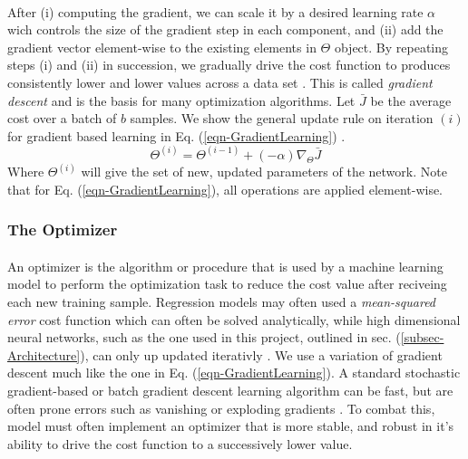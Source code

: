 \documentclass[12pt,letterpaper]{article}
\begin{document}
\paragraph*{}After (i) computing the gradient, we can scale it by a desired learning rate $\alpha$ wich controls the size of the gradient step in each component, and (ii) add the gradient vector element-wise to the existing elements in $\Theta$ object. By repeating steps (i) and (ii) in succession, we gradually drive the cost function to produces consistently lower and lower values across a data set \cite{Geron}. This is called \textit{gradient descent} and is the basis for many optimization algorithms. Let $\bar{J}$ be the average cost over a batch of $b$ samples. We show the general update rule on iteration $(i)$ for gradient based learning in Eq. (\ref{eqn-GradientLearning}) \cite{Geron,Goodfellow}.
\begin{equation}
\label{eqn-GradientLearning}
\Theta^{(i)} = \Theta^{(i-1)} + (-\alpha) \nabla_{\Theta} \bar{J}
\end{equation}
Where $\Theta^{(i)}$ will give the set of new, updated parameters of the network. Note that for Eq. (\ref{eqn-GradientLearning}), all operations are applied element-wise.


\subsubsection{The Optimizer}
\label{subsubsec-Optimizer}

\paragraph*{}An optimizer is the algorithm or procedure that is used by a machine learning model to perform the optimization task to reduce the cost value after reciveing each new training sample. Regression models may often used a \textit{mean-squared error} cost function which can often be solved analytically, while high dimensional neural networks, such as the one used in this project, outlined in sec. (\ref{subsec-Architecture}), can only up updated iterativly \cite{Goodfellow,James,Loy}. We use a variation of gradient descent much like the one in Eq. (\ref{eqn-GradientLearning}). A standard stochastic gradient-based or batch gradient descent learning algorithm can be fast, but are often prone errors such as vanishing or exploding gradients \cite{Geron,Goodfellow,Loy}. To combat this, model must often implement an optimizer that is more stable, and robust in it's ability to drive the cost function to a successively lower value.
\end{document}
